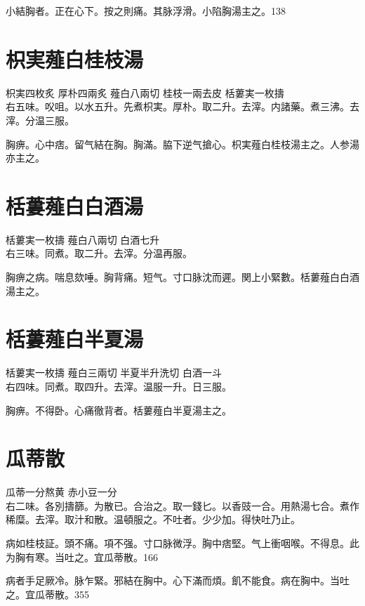 小結胸者。正在心下。按之則痛。其脉浮滑。小陷胸湯主之。138

\section{枳実薤白桂枝湯}

枳実{\scriptsize 四枚炙} 厚朴{\scriptsize 四兩炙} 薤白{\scriptsize 八兩切} 桂枝{\scriptsize 一兩去皮} 栝蔞実{\scriptsize 一枚擣}\\
右五味。㕮咀。以水五升。先煮枳実。厚朴。取二升。去滓。内諸藥。煮三沸。去滓。分温三服。

胸痹。心中痞。留气結在胸。胸滿。脇下逆{\khaaitp 气}搶心。枳実薤白桂枝湯主之。人参湯亦主之。

\section{栝蔞薤白白酒湯}

栝蔞実{\scriptsize 一枚擣} 薤白{\scriptsize 八兩切} 白酒{\scriptsize 七升}\\
右三味。同煮。取二升。去滓。分温再服。

胸痹之病。喘息欬唾。胸背痛。短气。寸口脉沈而遲。関上小緊數。栝蔞薤白白酒湯主之。

\section{栝蔞薤白半夏湯}

栝蔞実{\scriptsize 一枚擣} 薤白{\scriptsize 三兩切} 半夏{\scriptsize 半升洗切} 白酒{\scriptsize 一斗}\\
右四味。同煮。取四升。去滓。温服一升。日三服。

胸痹。不得卧。心痛徹背者。栝蔞薤白半夏湯主之。

\section{瓜蒂散}

瓜蒂{\scriptsize 一分熬黄} 赤小豆{\scriptsize 一分}\\
右二味。各別擣篩。为散已。合治之。取一錢匕。以香豉一合。用熱湯七合。煮作稀糜。去滓。取汁和散。温頓服之。不吐者。少少加。得快吐乃止。

病如桂枝証。頭不痛。項不强。寸{\khaaitp 口}脉微浮。胸中痞堅。气上衝咽喉。不得息。此为胸有寒。当吐之。宜瓜蒂散。166

病者手足厥冷。脉乍緊。邪結在胸中。心下滿而煩。飢不能食。病在胸中。当吐之。宜瓜蒂散。355

